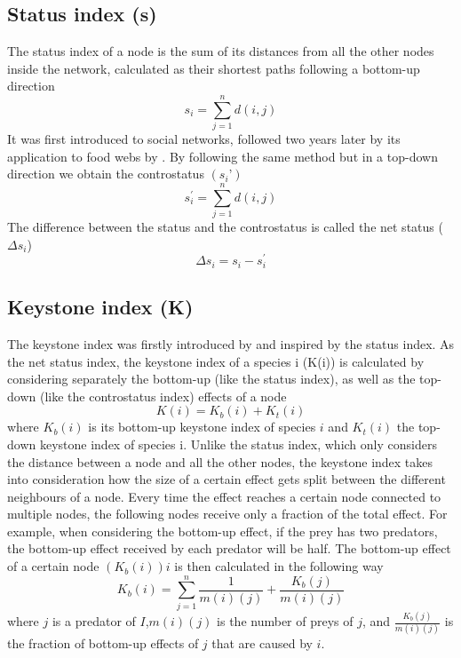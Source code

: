 \documentclass[twocolumn]{article}
\begin{document}
	\subsection*{Status index (s)} The status index of a node is the sum of its distances from all the other nodes inside the network, calculated as their shortest paths following a bottom-up direction \citep{Endredi2018} \begin{equation} s_i=\sum_{j=1}^{n}d\left(i,j\right) \end{equation} It was first  introduced to social networks, followed two years later by its application to food webs by \citet{Harary1959, Harary1961}.
		By following the same method but in a top-down direction we obtain the controstatus $(s_i’)$ \begin{equation} s_i^\prime=\sum_{j=1}^{n}d\left(i,j\right) \end{equation} The difference between the status and the controstatus is called the net status ($\Delta s_i$) \begin{equation} \Delta s_i=s_i-s_i^\prime \end{equation} \subsection*{Keystone index (K)} The keystone index was firstly introduced by \citet{Jordan1999} and inspired by the status index.
		As the net status index, the keystone index of a species i (K(i)) is calculated by considering separately the bottom-up (like the status index), as well as the top-down (like the controstatus index) effects of a node \citet{Jordan2006} \begin{equation} K\left(i\right)=K_b\left(i\right)+K_t\left(i\right) \end{equation} where $K_b\left(i\right)$ is its bottom-up keystone index of species $i$ and $K_t\left(i\right)$ the top-down keystone index of species i.
		Unlike the status index, which only considers the distance between a node and all the other nodes, the keystone index takes into consideration how the size of a certain effect gets split between the different neighbours of a node.
		Every time the effect reaches a certain node connected to multiple nodes, the following nodes receive only a fraction of the total effect.
		For example, when considering the bottom-up effect, if the prey has two predators, the bottom-up effect received by each predator will be half.
		The bottom-up effect of a certain node $(K_b\left(i\right)) i$ is then calculated in the following way \begin{equation} K_b\left(i\right)=\sum_{j=1}^{n}\frac{1}{m\left(i\right)\left(j\right)}+\frac{K_b\left(j\right)}{m\left(i\right)\left(j\right)} \end{equation} where $j$ is a predator of $I$,$m(i)(j)$ is the number of preys of $j$, and $\frac{K_b\left(j\right)}{m\left(i\right)\left(j\right)}$ is the fraction of bottom-up effects of $j$ that are caused by $i$.
\end{document}
